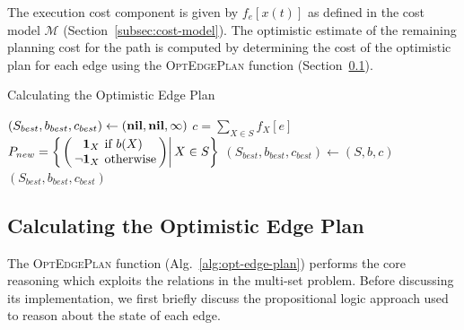 \documentclass{report}
\begin{document}
The execution cost component is given by $f_e[x(t)]$
as defined in the cost model $\mathcal{M}$
(Section~\ref{subsec:cost-model}).
The optimistic estimate of the remaining planning cost for the path
is computed by determining the cost of the optimistic plan for each
edge using the \textsc{OptEdgePlan} function
(Section~\ref{subsec:alg-opt-edge-plan}).

\begin{algorithm}
\caption{Calculating the Optimistic Edge Plan}
\label{alg:opt-edge-plan}
\begin{algorithmic}[1]
   \State $(S_{best}, b_{best}, c_{best})
      \leftarrow (\mbox{\textbf{nil}}, \mbox{\textbf{nil}}, \infty)$
         \label{line:power-set}
      \State $c = \sum_{X \in S} f_X[e]$
            \label{line:all-binary-functions}
         \State $\arraycolsep=2pt
            P_{new} =
            \left\{\left.\left( \begin{array}{rl}
            \mathbf{1}_X & \mbox{if } b(X) \\
            \lnot \mathbf{1}_X & \mbox{otherwise} \\
            \end{array} \right)
            \right|
            X \in S
            \right\}$
               \State $(S_{best}, b_{best}, c_{best})
                  \leftarrow (S, b, c)$
            \EndIf
         \EndIf
      \EndFor
   \EndFor
   \State \Return $(S_{best}, b_{best}, c_{best})$
\EndFunction
\end{algorithmic}
\end{algorithm}

\subsection{Calculating the Optimistic Edge Plan}
\label{subsec:alg-opt-edge-plan}

The \textsc{OptEdgePlan} function (Alg.~\ref{alg:opt-edge-plan})
performs the core reasoning which exploits the relations in
the multi-set problem.
Before discussing its implementation,
we first briefly discuss the propositional logic approach
used to reason about the state of each edge.
\end{document}
